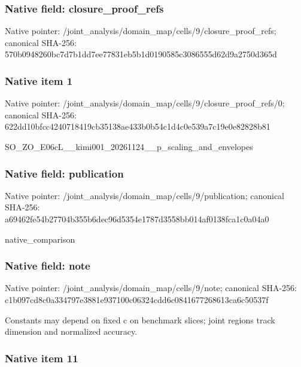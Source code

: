 \documentclass[10pt,a4paper]{article}
\begin{document}
\subsubsection{Native field: closure\_proof\_refs}


Native pointer: /joint\_analysis/domain\_m\allowbreak{}ap/cells/9/closure\_proof\allowbreak{}\_refs; canonical SHA-256: 570b0948260bc7d7b1dd7ee7\allowbreak{}7831eb5b1d0190585c308655\allowbreak{}5d62d9a2750d365d



\subsubsection{Native item 1}


Native pointer: /joint\_analysis/domain\_m\allowbreak{}ap/cells/9/closure\_proof\allowbreak{}\_refs/0; canonical SHA-256: 622dd10bfcc4240718419cb3\allowbreak{}5138ae433b0b54c1d4c0e539\allowbreak{}a7c19e0e82828b81


SO\_ZO\_E06cL\_\_kimi001\_202\allowbreak{}61124\_\_p\_scaling\_and\_env\allowbreak{}elopes


\subsubsection{Native field: publication}


Native pointer: /joint\_analysis/domain\_m\allowbreak{}ap/cells/9/publication; canonical SHA-256: a69462fe54b27704b355b6de\allowbreak{}c96d5354e1787d3558bb014a\allowbreak{}f0138fca1c0a04a0


native\_comparison


\subsubsection{Native field: note}


Native pointer: /joint\_analysis/domain\_map/cells/9/note; canonical SHA-256: c1b097cd8c0a334797e3881e\allowbreak{}937100c06324cdd6c0841677\allowbreak{}268613ca6c50537f


Constants may depend on fixed c on benchmark slices; joint regions track dimension and normalized accuracy.


\subsubsection{Native item 11}
\end{document}

